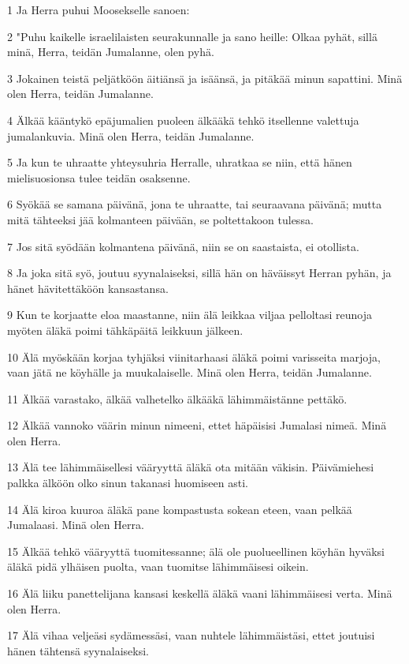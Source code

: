 \par 1 Ja Herra puhui Moosekselle sanoen:
\par 2 "Puhu kaikelle israelilaisten seurakunnalle ja sano heille: Olkaa pyhät, sillä minä, Herra, teidän Jumalanne, olen pyhä.
\par 3 Jokainen teistä peljätköön äitiänsä ja isäänsä, ja pitäkää minun sapattini. Minä olen Herra, teidän Jumalanne.
\par 4 Älkää kääntykö epäjumalien puoleen älkääkä tehkö itsellenne valettuja jumalankuvia. Minä olen Herra, teidän Jumalanne.
\par 5 Ja kun te uhraatte yhteysuhria Herralle, uhratkaa se niin, että hänen mielisuosionsa tulee teidän osaksenne.
\par 6 Syökää se samana päivänä, jona te uhraatte, tai seuraavana päivänä; mutta mitä tähteeksi jää kolmanteen päivään, se poltettakoon tulessa.
\par 7 Jos sitä syödään kolmantena päivänä, niin se on saastaista, ei otollista.
\par 8 Ja joka sitä syö, joutuu syynalaiseksi, sillä hän on häväissyt Herran pyhän, ja hänet hävitettäköön kansastansa.
\par 9 Kun te korjaatte eloa maastanne, niin älä leikkaa viljaa pelloltasi reunoja myöten äläkä poimi tähkäpäitä leikkuun jälkeen.
\par 10 Älä myöskään korjaa tyhjäksi viinitarhaasi äläkä poimi varisseita marjoja, vaan jätä ne köyhälle ja muukalaiselle. Minä olen Herra, teidän Jumalanne.
\par 11 Älkää varastako, älkää valhetelko älkääkä lähimmäistänne pettäkö.
\par 12 Älkää vannoko väärin minun nimeeni, ettet häpäisisi Jumalasi nimeä. Minä olen Herra.
\par 13 Älä tee lähimmäisellesi vääryyttä äläkä ota mitään väkisin. Päivämiehesi palkka älköön olko sinun takanasi huomiseen asti.
\par 14 Älä kiroa kuuroa äläkä pane kompastusta sokean eteen, vaan pelkää Jumalaasi. Minä olen Herra.
\par 15 Älkää tehkö vääryyttä tuomitessanne; älä ole puolueellinen köyhän hyväksi äläkä pidä ylhäisen puolta, vaan tuomitse lähimmäisesi oikein.
\par 16 Älä liiku panettelijana kansasi keskellä äläkä vaani lähimmäisesi verta. Minä olen Herra.
\par 17 Älä vihaa veljeäsi sydämessäsi, vaan nuhtele lähimmäistäsi, ettet joutuisi hänen tähtensä syynalaiseksi.
